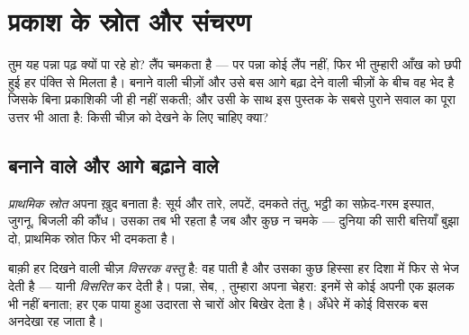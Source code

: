 \chapter{प्रकाश के स्रोत और संचरण}\label{ch:g7:light-sources-propagation}

तुम यह पन्ना पढ़ क्यों पा रहे हो? लैंप चमकता है --- पर पन्ना कोई लैंप
नहीं, फिर भी तुम्हारी आँख को छपी हुई हर पंक्ति से  मिलता है।
 बनाने वाली चीज़ों और उसे बस आगे बढ़ा देने वाली चीज़ों के बीच वह
भेद है जिसके बिना प्रकाशिकी जी ही नहीं सकती; और उसी के साथ इस पुस्तक
के सबसे पुराने सवाल का पूरा उत्तर भी आता है: किसी चीज़ को देखने के लिए
चाहिए क्या?

\section{बनाने वाले और आगे बढ़ाने वाले}

\begin{definition}[प्राथमिक स्रोत]\label{def:g7:light-sources-propagation:primary}
\emph{प्राथमिक स्रोत} अपना  ख़ुद बनाता है:
सूर्य और तारे, लपटें, दमकते तंतु, भट्ठी का सफ़ेद-गरम इस्पात, जुगनू,
बिजली की कौंध। उसका  तब भी रहता है जब और कुछ न चमके --- दुनिया
की सारी बत्तियाँ बुझा दो, प्राथमिक स्रोत फिर भी दमकता है।
\end{definition}

\begin{definition}[विसरक वस्तुएँ]\label{def:g7:light-sources-propagation:diffusion}
बाक़ी हर दिखने वाली चीज़ \emph{विसरक वस्तु} है: वह 
पाती है और उसका कुछ हिस्सा हर दिशा में फिर से भेज देती है --- यानी
\emph{विसरित} कर देती है। पन्ना, सेब, , तुम्हारा अपना चेहरा:
इनमें से कोई अपनी एक झलक भी नहीं बनाता; हर एक पाया हुआ  उदारता
से चारों ओर बिखेर देता है। अँधेरे में कोई विसरक बस अनदेखा रह जाता है।
\end{definition}


